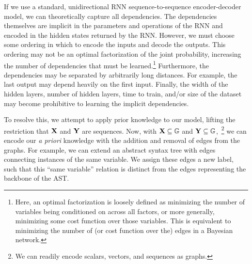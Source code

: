 


If we use a standard, unidirectional RNN sequence-to-sequence encoder-decoder 
model, we can theoretically capture all dependencies. The dependencies 
themselves are implicit in the parameters and operations of the RNN and encoded 
in the hidden states returned by the RNN\@. However, we must choose some 
ordering in which to encode the inputs and decode the outputs. This ordering may 
not be an optimal factorization of the joint probability, increasing the number 
of dependencies that must be learned.\footnote{Here, an optimal factorization is 
	loosely defined as minimizing the number of variables being conditioned on 
across all factors, or more generally, minimizing some cost function over those 
variables. This is equivalent to minimizing the number of (or cost function over 
the) edges in a Bayesian network.}	Furthermore, the dependencies may be 
separated by arbitrarily long distances. For example, the last output may depend 
heavily on the first input. Finally, the width of the hidden layers, number of 
hidden layers, time to train, and/or size of the dataset may become prohibitive 
to learning the implicit dependencies.



To resolve this, we attempt to apply prior knowledge to our model, lifting the 
restriction that ${\mathbf{X}}$ and ${\mathbf{Y}}$ are sequences. Now, with ${\mathbf{X}} 
\subseteq {\mathbb{G}}$ and ${\mathbf{Y}} \subseteq {\mathbb{G}}$,~\footnote{We can readily 
encode scalars, vectors, and sequences as graphs.} we can encode our \textit{a priori} knowledge with the addition and removal of 
edges from the graphs. For example, we can extend an abstract syntax tree with 
edges connecting instances of the same variable. We assign these edges a new 
label, such that this ``same variable'' relation is distinct from the edges 
representing the backbone of the AST\@.  

